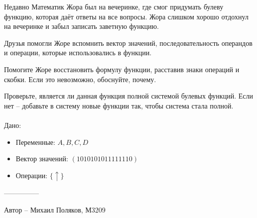\question
Недавно Математик Жора был на вечеринке, где смог придумать булеву функцию, которая даёт ответы на все вопросы. Жора слишком хорошо отдохнул на вечеринке и забыл записать заветную функцию.

Друзья помогли Жоре вспомнить вектор значений, последовательность операндов и операции, которые использовались в функции.

Помогите Жоре восстановить формулу функции, расставив знаки операций и скобки. Если это невозможно, обоснуйте, почему.

Проверьте, является ли данная функция полной системой булевых функций. Если нет -- добавьте в систему новые функции так, чтобы система стала полной.
\\
\\
Дано:
\begin{itemize}
\item Переменные: $A, B, C, D$
\item Вектор значений: $(1010101011111110)$
\item Операции: $\{\uparrow\}$
\end{itemize}

---------------

Автор -- Михаил Поляков, М3209